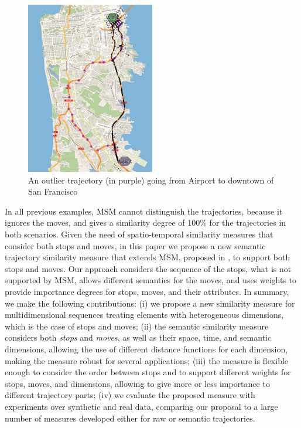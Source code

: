 \begin{figure}[h]
\centering
\includegraphics[width=0.5\textwidth]{Images/CRAWDAD-Outlier.jpg}
\caption{\label{fig:crawdad_outlier} An outlier trajectory (in purple) going from Airport to downtown of San Francisco}
\end{figure}

In all previous examples, MSM cannot distinguish the trajectories, because it ignores the moves, and gives a similarity degree of 100\% for the trajectories in both scenarios.
Given the need of spatio-temporal similarity measures that consider both stops and moves, in this paper we propose a new semantic trajectory similarity measure that extends MSM, proposed in \cite{Furtado:TGIS12156}, to support both stops and moves. Our approach considers the sequence of the stops, what is not supported by MSM, allows different semantics for the moves, and uses weights to provide importance degrees for stops, moves, and their attributes. 
In summary, we make the following contributions:
(i) we propose a new similarity measure for multidimensional sequences treating elements with heterogeneous dimensions, which is the case of stops and moves; (ii) the semantic similarity measure considers both \textit{stops} and \textit{moves}, as well as their space, time, and semantic dimensions, allowing the use of different distance functions for each dimension, making the measure robust for several applications; (iii) the measure is flexible enough to consider the order between stops and to support different weights for stops, moves, and dimensions, allowing to give more or less importance to different trajectory parts; (iv) we evaluate the proposed measure with experiments over synthetic and real data, comparing our proposal to a large number of measures developed either for raw or semantic trajectories.

